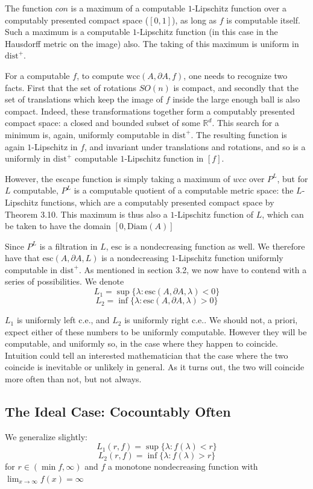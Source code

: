\documentclass[10pt,a4paper]{article}
\theoremstyle{definition}
\def\R{\mathbb{R}}
\begin{document}
The function $con$ is a maximum of a computable $1$-Lipschitz function over a computably presented compact space ($[0,1]$), as long as $f$ is computable itself. Such a maximum is a computable $1$-Lipschitz function (in this case in the Hausdorff metric on the image) also. The taking of this maximum is uniform in $\mathrm{dist}^+$.

For a computable $f$, to compute $\mathrm{wcc}(A,\partial A, f)$, one needs to recognize two facts. First that the set of rotations $SO(n)$ is compact, and secondly that the set of translations which keep the image of $f$ inside the large enough ball is also compact. Indeed, these transformations together form a computably presented compact space: a closed and bounded subset of some $\R^d$. This search for a minimum is, again, uniformly computable  in $\mathrm{dist}^+$. The resulting function is again $1$-Lipschitz in $f$, and invariant under translations and rotations, and so is a uniformly in $\mathrm{dist}^+$ computable $1$-Lipschitz function in $[f]$.

However, the escape function is simply taking a maximum of $wcc$ over $P^L$, but for $L$ computable, $P^L$ is a computable quotient of a computable metric space: the $L$-Lipschitz functions, which are a computably presented compact space by Theorem 3.10. This maximum is thus also a $1$-Lipschitz function of $L$, which can be taken to have the domain $[0,\mathrm{Diam}(A)]$

Since $P^L$ is a filtration in $L$, $\mathrm{esc}$ is a nondecreasing function as well. We therefore have that $\mathrm{esc}(A,\partial A, L)$ is a nondecreasing $1$-Lipschitz function uniformly computable in $\mathrm{dist}^+$. As mentioned in section 3.2, we now have to contend with a series of possibilities. We denote 
$$L_1 = \sup\{\lambda: \mathrm{esc}(A,\partial A,\lambda) < 0\}$$
$$L_2 = \inf\{\lambda: \mathrm{esc}(A,\partial A,\lambda) > 0\}$$

$L_1$ is uniformly left c.e., and $L_2$ is uniformly right c.e.. We should not,  a priori, expect either of these numbers to be uniformly computable. However they will be computable, and uniformly so, in the case where they happen to coincide. Intuition could tell an interested mathematician that the case where the two coincide is inevitable or unlikely in general. As it turns out, the two will coincide more often than not, but not always.

\subsection{The Ideal Case: Cocountably Often}
We generalize slightly:
\label{sec:cocount}
$$L_1(r,f) = \sup\{\lambda: f(\lambda) < r\}$$
$$L_2(r,f) = \inf\{\lambda:f(\lambda) > r\}$$
for $r\in(\min f, \infty)$ and $f$ a monotone nondecreasing function with $\lim_{x\rightarrow \infty}f(x) = \infty$
\end{document}

